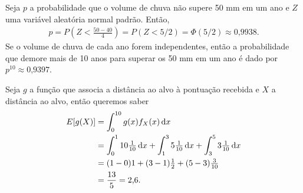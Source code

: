 \begin{questions}
\begin{solution}
\end{solution}

\begin{solution}
Seja $p$ a probabilidade que o volume de chuva não supere 50 mm em um ano e $Z$ uma variável aleatória normal padrão. Então,
\begin{align*}
	p = P(Z < \tfrac{50-40}{4}) = P(Z<5/2) = \Phi(5/2)
    	\approx \text{0,9938}.
\end{align*}
Se o volume de chuva de cada ano forem independentes, então a probabilidade que demore mais de 10 anos para superar os 50 mm em um ano é dado por $p^{10}\approx \text{0,9397}$.
\end{solution}

\begin{solution}
	Seja $g$ a função que associa a distância ao alvo à pontuação recebida e $X$ a distância ao alvo, então queremos saber
    \begin{align*}
    	E[g(X)]
        	&= \int_0^{10} g(x) f_X(x)\,\mathrm{d} x \\
        	&= \int_{0}^1 10\tfrac{1}{10} \,\mathrm{d} x
            	+\int_{1}^3 5\tfrac{1}{10} \,\mathrm{d} x
                +\int_{3}^5 3\tfrac{1}{10} \,\mathrm{d} x \\
            &= (1-0) 1 + (3-1) \tfrac{1}{2} + (5-3) \tfrac{3}{10}\\
            &= \frac{13}{5} = \text{2,6}.
    \end{align*}
\end{solution}


\end{questions}
